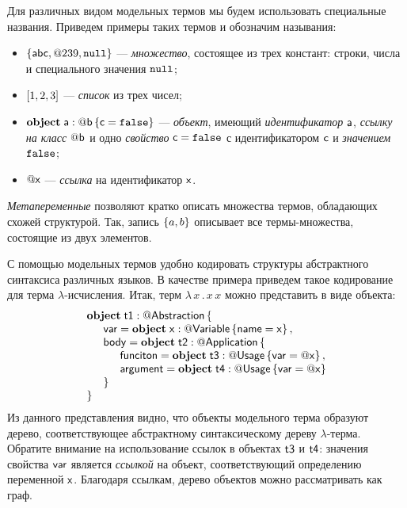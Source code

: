 Для различных видом модельных термов мы будем использовать специальные названия. Приведем примеры таких термов и обозначим называния:
\begin{itemize}
\item $\left\{\mathsf{abc}, @239, \mathtt{null}\right\}$ --- \emph{множество}, состоящее из трех констант: строки, числа и специального значения $\mathtt{null}$;
\item $\left[1, 2, 3\right]$ --- \emph{список} из трех чисел;
\item $\mathbf{object}\;\mathsf{a} : @\mathsf{b}\left\{ \mathsf{c}=\mathtt{false} \right\}$ --- \emph{объект}, имеющий \emph{идентификатор} $\mathsf{a}$, \emph{ссылку на класс} $@\mathsf{b}$ и одно \emph{свойство} $\mathsf{c} = \mathtt{false}$ с идентификатором $\mathsf{c}$ и \emph{значением} $\mathtt{false}$;
\item $@\mathsf{x}$ --- \emph{ссылка} на идентификатор $\mathsf{x}$.
\end{itemize}

\emph{Метапеременные} позволяют кратко описать множества термов, обладающих схожей структурой. Так, запись $\left\{a, b\right\}$ описывает все термы-множества, состоящие из двух элементов.

С помощью модельных термов удобно кодировать структуры абстрактного синтаксиса различных языков. В качестве примера приведем такое кодирование для терма $\lambda$-исчисления. Итак, терм $\lambda \, x\,.\,x\,x$ можно представить в виде объекта:
$$
\begin{array}{l}
	\ObjectH{\String{t1}}{\Ref{\String{Abstraction}}}\, \{\\
\indent
	\String{var} = \Object{\String{x}}{\Ref{\String{Variable}}}{\String{name}=\String{x}},\\
\indent
	\String{body} = \ObjectH{\String{t2}}{\Ref{\String{Application}}} \,\{\\
	\indent \indent \String{funciton} = \Object{\String{t3}}{\Ref{\String{Usage}}}{\String{var} = \Ref{\String{x}}}, \\
	\indent \indent \String{argument} = \Object{\String{t4}}{\Ref{\String{Usage}}}{\String{var} = \Ref{\String{x}}} \\
	\indent \}\\
	\}
\end{array}
$$
Из данного представления видно, что объекты модельного терма образуют дерево, соответствующее абстрактному синтаксическому дереву $\lambda$-терма. Обратите внимание на использование ссылок в объектах $\mathsf{t3}$ и $\mathsf{t4}$: значения свойства $\mathsf{var}$ является \emph{ссылкой} на объект, соответствующий определению переменной $\mathsf{x}$. Благодаря ссылкам, дерево объектов можно рассматривать как граф. 

